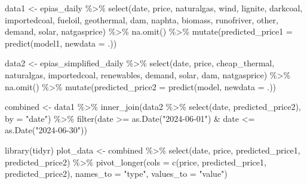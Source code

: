\documentclass[
]{article}
\newenvironment{Shaded}{\begin{snugshade}}{\end{snugshade}}
\newcommand{\AttributeTok}[1]{\textcolor[rgb]{0.40,0.45,0.13}{#1}}
\newcommand{\FunctionTok}[1]{\textcolor[rgb]{0.28,0.35,0.67}{#1}}
\newcommand{\NormalTok}[1]{\textcolor[rgb]{0.00,0.23,0.31}{#1}}
\newcommand{\OtherTok}[1]{\textcolor[rgb]{0.00,0.23,0.31}{#1}}
\newcommand{\SpecialCharTok}[1]{\textcolor[rgb]{0.37,0.37,0.37}{#1}}
\newcommand{\StringTok}[1]{\textcolor[rgb]{0.13,0.47,0.30}{#1}}
\begin{document}
\begin{Shaded}
\begin{Highlighting}[]
\NormalTok{data1 }\OtherTok{\textless{}{-}}\NormalTok{ epias\_daily }\SpecialCharTok{\%\textgreater{}\%}
  \FunctionTok{select}\NormalTok{(date, price, naturalgas, wind, lignite, darkcoal, importedcoal, fueloil, geothermal, dam, naphta, biomass, runofriver, other, demand, solar, natgasprice) }\SpecialCharTok{\%\textgreater{}\%}
  \FunctionTok{na.omit}\NormalTok{() }\SpecialCharTok{\%\textgreater{}\%}
  \FunctionTok{mutate}\NormalTok{(}\AttributeTok{predicted\_price1 =} \FunctionTok{predict}\NormalTok{(model1, }\AttributeTok{newdata =}\NormalTok{ .))}

\NormalTok{data2 }\OtherTok{\textless{}{-}}\NormalTok{ epias\_simplified\_daily }\SpecialCharTok{\%\textgreater{}\%}
  \FunctionTok{select}\NormalTok{(date, price, cheap\_thermal, naturalgas, importedcoal, renewables, demand, solar, dam, natgasprice) }\SpecialCharTok{\%\textgreater{}\%}
  \FunctionTok{na.omit}\NormalTok{() }\SpecialCharTok{\%\textgreater{}\%}
  \FunctionTok{mutate}\NormalTok{(}\AttributeTok{predicted\_price2 =} \FunctionTok{predict}\NormalTok{(model, }\AttributeTok{newdata =}\NormalTok{ .))}


\NormalTok{combined }\OtherTok{\textless{}{-}}\NormalTok{ data1 }\SpecialCharTok{\%\textgreater{}\%}
  \FunctionTok{inner\_join}\NormalTok{(data2 }\SpecialCharTok{\%\textgreater{}\%} \FunctionTok{select}\NormalTok{(date, predicted\_price2), }\AttributeTok{by =} \StringTok{"date"}\NormalTok{) }\SpecialCharTok{\%\textgreater{}\%}
  \FunctionTok{filter}\NormalTok{(date }\SpecialCharTok{\textgreater{}=} \FunctionTok{as.Date}\NormalTok{(}\StringTok{"2024{-}06{-}01"}\NormalTok{) }\SpecialCharTok{\&}\NormalTok{ date }\SpecialCharTok{\textless{}=} \FunctionTok{as.Date}\NormalTok{(}\StringTok{"2024{-}06{-}30"}\NormalTok{))}


\FunctionTok{library}\NormalTok{(tidyr)}
\NormalTok{plot\_data }\OtherTok{\textless{}{-}}\NormalTok{ combined }\SpecialCharTok{\%\textgreater{}\%}
  \FunctionTok{select}\NormalTok{(date, price, predicted\_price1, predicted\_price2) }\SpecialCharTok{\%\textgreater{}\%}
  \FunctionTok{pivot\_longer}\NormalTok{(}\AttributeTok{cols =} \FunctionTok{c}\NormalTok{(price, predicted\_price1, predicted\_price2),}
               \AttributeTok{names\_to =} \StringTok{"type"}\NormalTok{, }\AttributeTok{values\_to =} \StringTok{"value"}\NormalTok{)}



\end{Highlighting}
\end{Shaded}
\end{document}

